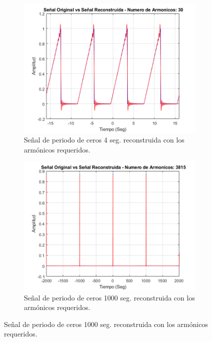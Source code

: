 \documentclass[7pt]{article}
\begin{document}
    \begin{figure}[H]
        \centering 
        \begin{subfigure}[h]{0.45\linewidth}
            \includegraphics[width=\linewidth]{img/figure9_A.png}
            \caption{Señal de periodo de ceros 4 seg. reconstruida con los armónicos requeridos.}
            \label{figure9_A}
        \end{subfigure}
        \begin{subfigure}[h]{0.45\linewidth}
            \includegraphics[width=\linewidth]{img/figure9_B.png}
            \caption{Señal de periodo de ceros 1000 seg. reconstruida con los armónicos requeridos.}
            \label{figure9_B}
        \end{subfigure}
        \label{figure9}
    \end{figure}
        
\end{document}
